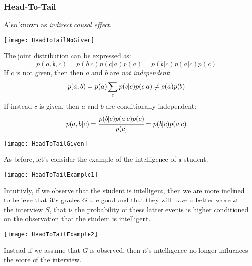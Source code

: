 \subsubsection{Head-To-Tail}
Also known as \textit{indirect causal effect}.
\begin{center}
	\texttt{[image: HeadToTailNoGiven]}
\end{center}
The joint distribution can be expressed as:
\[
p(a,b,c)=p(b\vert c)p(c\vert a)p(a)=p(b\vert c)p(a\vert c)p(c)
\]
If $c$ is not given, then then $a$ and $b$ are \textit{not independent}:
\[
p(a,b)=p(a)\displaystyle\sum_cp(b\vert c)p(c\vert a)\neq p(a)p(b)
\]
If instead $c$ is given, then $a$ and $b$ are conditionally independent:
\[
p(a,b\vert c)=\cfrac{p(b\vert c)p(a\vert c)p(c)}{p(c)}=p(b\vert c)p(a\vert c)
\]
\begin{center}
  \texttt{[image: HeadToTailGiven]}
\end{center}
As before, let's consider the example of the intelligence of a student. \newline
\begin{minipage}[htp]{\linewidth}
	\begin{minipage}[t]{0.48\linewidth}
		\begin{center}
			\texttt{[image: HeadToTailExample1]}
		\end{center}
    Intuitivly, if we observe that the student is intelligent, then we are more inclined to believe that it's grades $G$ are good and that they will have a better score at the interview $S$, that is the probability of these latter events is higher conditioned on the observation that the student is intelligent. 	
	\end{minipage}
	\hspace{0.04\linewidth}
	\begin{minipage}[t]{0.48\linewidth}
		\begin{center}
			\texttt{[image: HeadToTailExample2]}
		\end{center}
    Instead if we assume that $G$ is observed, then it's intelligence no longer influences the score of the interview.
	\end{minipage}
\end{minipage}
%
